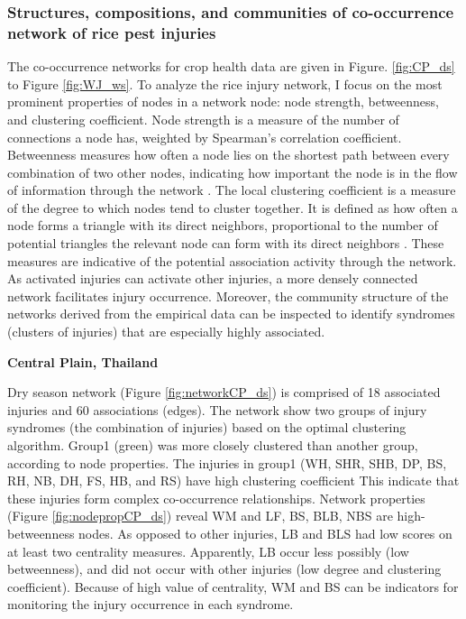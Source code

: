 \subsubsection{Structures, compositions, and communities of co-occurrence network of rice pest injuries}

The co-occurrence networks for crop health data are given in Figure. \ref{fig:CP_ds} to Figure \ref{fig:WJ_ws}. To analyze the rice injury network, I focus on the most prominent properties of nodes in a network node: node strength, betweenness, and clustering coefficient. Node strength is a measure of the number of connections a node has, weighted by Spearman’s correlation coefficient. Betweenness measures how often a node lies on the shortest path between every combination of two other nodes, indicating how important the node is in the flow of information through the network \citep{Opsahl_2010_Node}. The local clustering coefficient is a measure of the degree to which nodes tend to cluster together. It is defined as how often a node forms a triangle with its direct neighbors, proportional to the number of potential triangles the relevant node can form with its direct neighbors \citet{Opsahl_2010_Node}. These measures are indicative of the potential association activity through the network. As activated injuries can activate other injuries, a more densely connected network facilitates injury occurrence. Moreover, the community structure of the networks derived from the empirical data can be inspected to identify syndromes (clusters of injuries) that are especially highly associated.
%

\textbf{Central Plain, Thailand}

Dry season network (Figure \ref{fig:networkCP_ds}) is comprised of 18 associated injuries and  60 associations (edges). The network show two groups of injury syndromes (the combination of injuries) based on the optimal clustering algorithm. Group1 (green) was more closely clustered than another group, according to node properties. The injuries in group1 (WH, SHR, SHB, DP, BS, RH, NB, DH, FS, HB, and RS) have high clustering coefficient This indicate that these injuries form complex co-occurrence relationships. Network properties (Figure \ref{fig:nodepropCP_ds}) reveal WM and LF, BS, BLB, NBS are high-betweenness nodes. As opposed to other injuries, LB and BLS had low scores on at least two centrality measures. Apparently, LB occur less possibly (low betweenness), and did not occur with other injuries (low degree and clustering coefficient). Because of high value of centrality, WM and BS can be indicators for monitoring the injury occurrence in each syndrome.

